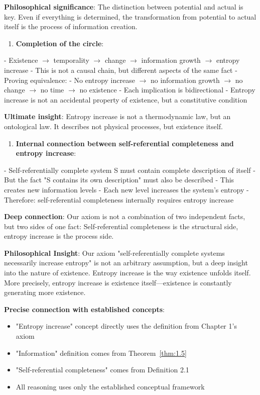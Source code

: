    \textbf{Philosophical significance}: The distinction between potential and actual is key.
   Even if everything is determined, the transformation from potential to actual
   itself is the process of information creation.

\begin{enumerate}
\item \textbf{Completion of the circle}:
\end{enumerate}
   - Existence $\rightarrow$ temporality $\rightarrow$ change $\rightarrow$ information growth $\rightarrow$ entropy increase
   - This is not a causal chain, but different aspects of the same fact
   - Proving equivalence:
     - No entropy increase $\rightarrow$ no information growth $\rightarrow$ no change $\rightarrow$ no time $\rightarrow$ no existence
     - Each implication is bidirectional
   - Entropy increase is not an accidental property of existence, but a constitutive condition
   
   \textbf{Ultimate insight}: Entropy increase is not a thermodynamic law,
   but an ontological law.
   It describes not physical processes, but existence itself.

\begin{enumerate}
\item \textbf{Internal connection between self-referential completeness and entropy increase}:
\end{enumerate}
   - Self-referentially complete system S must contain complete description of itself
   - But the fact "S contains its own description" must also be described
   - This creates new information levels
   - Each new level increases the system's entropy
   - Therefore: self-referential completeness internally requires entropy increase
   
   \textbf{Deep connection}: Our axiom is not a combination of two independent facts,
   but two sides of one fact:
   Self-referential completeness is the structural side, entropy increase is the process side.

\textbf{Philosophical Insight}:
Our axiom "self-referentially complete systems necessarily increase entropy" is not an arbitrary assumption,
but a deep insight into the nature of existence. Entropy increase is the way existence unfolds itself.
More precisely, entropy increase is existence itself---existence is constantly generating more existence.

\textbf{Precise connection with established concepts}:
\begin{itemize}
\item "Entropy increase" concept directly uses the definition from Chapter 1's axiom
\item "Information" definition comes from Theorem~\ref{thm:1.5}
\item "Self-referential completeness" comes from Definition 2.1
\item All reasoning uses only the established conceptual framework
\end{itemize}

